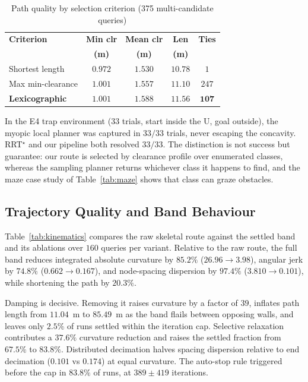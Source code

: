 \documentclass[conference]{IEEEtran}
\begin{document}
\begin{table}[htbp]
\caption{Path quality by selection criterion (375 multi-candidate queries)}
\label{tab:clearance}
\begin{center}
\begin{tabular}{@{}lcccc@{}}
\toprule
\textbf{Criterion} & \textbf{Min clr} & \textbf{Mean clr} & \textbf{Len} & \textbf{Ties} \\
& \textbf{(m)} & \textbf{(m)} & \textbf{(m)} & \\ \midrule
Shortest length & $0.972$ & $1.530$ & $\mathbf{10.78}$ & $1$ \\
Max min-clearance & $\mathbf{1.001}$ & $1.557$ & $11.10$ & $247$ \\
\textbf{Lexicographic} & $\mathbf{1.001}$ & $\mathbf{1.588}$ & $11.56$ & $\mathbf{107}$ \\ \bottomrule
\end{tabular}
\end{center}
\end{table}

In the E4 trap environment ($33$ trials, start inside the U, goal outside), the myopic local planner was captured in $33/33$ trials, never escaping the concavity. RRT$^\star$ and our pipeline both resolved $33/33$. The distinction is not success but guarantee: our route is selected by clearance profile over enumerated classes, whereas the sampling planner returns whichever class it happens to find, and the maze case study of Table~\ref{tab:maze} shows that class can graze obstacles.

\subsection{Trajectory Quality and Band Behaviour}
\label{sec:res-band}

Table~\ref{tab:kinematics} compares the raw skeletal route against the settled band and its ablations over $160$ queries per variant. Relative to the raw route, the full band reduces integrated absolute curvature by $85.2\%$ ($26.96\rightarrow3.98$), angular jerk by $74.8\%$ ($0.662\rightarrow0.167$), and node-spacing dispersion by $97.4\%$ ($3.810\rightarrow0.101$), while shortening the path by $20.3\%$.

Damping is decisive. Removing it raises curvature by a factor of $39$, inflates path length from $11.04$~m to $85.49$~m as the band flails between opposing walls, and leaves only $2.5\%$ of runs settled within the iteration cap. Selective relaxation contributes a $37.6\%$ curvature reduction and raises the settled fraction from $67.5\%$ to $83.8\%$. Distributed decimation halves spacing dispersion relative to end decimation ($0.101$ vs $0.174$) at equal curvature. The auto-stop rule triggered before the cap in $83.8\%$ of runs, at $389\pm419$ iterations.
\end{document}
